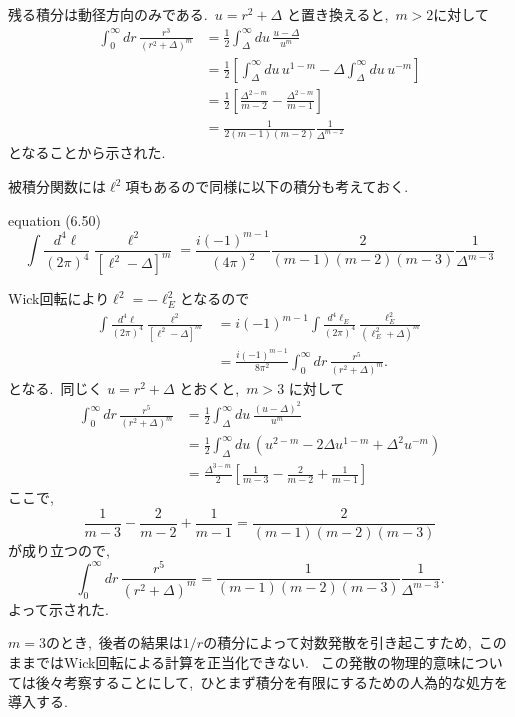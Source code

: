 \documentclass[uplatex,dvipdfmx,a4paper,11pt]{jsarticle}
\begin{document}
\begin{myproof}
  残る積分は動径方向のみである.~$u = r^2 +\Delta$ と置き換えると,~$m>2$に対して
\[
\begin{aligned}
\int_0^\infty dr\,
\frac{r^3}{(r^2+\Delta)^m}
&=\frac12\int_\Delta^\infty du\,
\frac{u-\Delta}{u^m}
\\
&=\frac12
\left[
\int_\Delta^\infty du\,u^{1-m}
-\Delta\int_\Delta^\infty du\,u^{-m}
\right]
\\
&=\frac12
\left[
\frac{\Delta^{2-m}}{m-2}
-\frac{\Delta^{2-m}}{m-1}
\right]
\\
&=\frac{1}{2(m-1)(m-2)}
\frac{1}{\Delta^{m-2}}
\end{aligned}
\]
となることから示された.~
\end{myproof}
被積分関数には$\ell^2$項もあるので同様に以下の積分も考えておく.
\begin{mylemma}{equation (6.50)}
 \[
\int\frac{d^4\ell}{(2\pi)^4}
\frac{\ell^2}{[\ell^2-\Delta]^m}
=
\frac{i(-1)^{m-1}}{(4\pi)^2}
\frac{2}{(m-1)(m-2)(m-3)}
\frac{1}{\Delta^{m-3}}
\]
\end{mylemma}
\begin{myproof}
   Wick回転により$\ell^2 = -\ell_E^2$となるので
\[
\begin{aligned}
\int\frac{d^4\ell}{(2\pi)^4}
\frac{\ell^2}{[\ell^2-\Delta]^m}
&=i(-1)^{m-1}
\int\frac{d^4\ell_E}{(2\pi)^4}
\frac{\ell_E^2}{(\ell_E^2+\Delta)^m}
\\
&=\frac{i(-1)^{m-1}}{8\pi^2}
\int_0^\infty dr\,
\frac{r^5}{(r^2+\Delta)^m}.
\end{aligned}
\]
となる.~同じく \(u=r^2+\Delta\) とおくと,~\(m>3\) に対して
\[
\begin{aligned}
\int_0^\infty dr\,
\frac{r^5}{(r^2+\Delta)^m}
&=\frac12\int_\Delta^\infty du\,
\frac{(u-\Delta)^2}{u^m}
\\
&=\frac12\int_\Delta^\infty du\,
\left(u^{2-m}-2\Delta u^{1-m}+\Delta^2u^{-m}\right)
\\
&=\frac{\Delta^{3-m}}{2}
\left[
\frac{1}{m-3}
-\frac{2}{m-2}
+\frac{1}{m-1}
\right]
\end{aligned}
\]
ここで,
\[
\frac{1}{m-3}-\frac{2}{m-2}+\frac{1}{m-1}
=
\frac{2}{(m-1)(m-2)(m-3)}
\]
が成り立つので,~
\[
\int_0^\infty dr\,
\frac{r^5}{(r^2+\Delta)^m}
=
\frac{1}{(m-1)(m-2)(m-3)}
\frac{1}{\Delta^{m-3}}.
\]
よって示された.
\end{myproof}
$m=3$のとき,~後者の結果は$1/r$の積分によって対数発散を引き起こすため,~このままではWick回転による計算を正当化できない.~
この発散の物理的意味については後々考察することにして,~ひとまず積分を有限にするための人為的な処方を導入する.~\\
\end{document}
